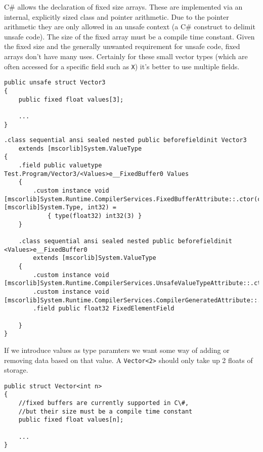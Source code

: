 C\# allows the declaration of fixed size arrays. These are implemented via an internal, explicitly sized class and pointer
arithmetic. Due to the pointer arithmetic they are only allowed in an unsafe context (a C\# construct to delimit unsafe code).
The size of the fixed array must be a compile time constant. Given the fixed size and the generally unwanted requirement for
unsafe code, fixed arrays don't have many uses. Certainly for these small vector types (which are often accessed for a specific 
field such as \texttt{X}) it's better to use multiple fields.

\begin{lstlisting}[caption={A fixed size vector type}, keywordstyle={\color{blue}},language=sharpc]
public unsafe struct Vector3
{
	public fixed float values[3]; 
	
	...
}
\end{lstlisting}

\begin{lstlisting}[caption={Translation to CIL}, keywordstyle={\color{blue}},language=cil]
.class sequential ansi sealed nested public beforefieldinit Vector3
    extends [mscorlib]System.ValueType
{
    .field public valuetype Test.Program/Vector3/<Values>e__FixedBuffer0 Values
    {
        .custom instance void [mscorlib]System.Runtime.CompilerServices.FixedBufferAttribute::.ctor(class [mscorlib]System.Type, int32) = 
			{ type(float32) int32(3) }
    }

    .class sequential ansi sealed nested public beforefieldinit <Values>e__FixedBuffer0
        extends [mscorlib]System.ValueType
    {
        .custom instance void [mscorlib]System.Runtime.CompilerServices.UnsafeValueTypeAttribute::.ctor()
        .custom instance void [mscorlib]System.Runtime.CompilerServices.CompilerGeneratedAttribute::.ctor()
        .field public float32 FixedElementField

    }
}
\end{lstlisting}

If we introduce values as type paramters we want some way of adding or removing data based on that value. A \texttt{Vector<2>} 
should only take up 2 floats of storage. 

\begin{lstlisting}[caption={A fixed size vector type}, keywordstyle={\color{blue}},language=sharpc]
public struct Vector<int n>
{
	//fixed buffers are currently supported in C\#,
	//but their size must be a compile time constant
	public fixed float values[n]; 
	
	...
}
\end{lstlisting}

